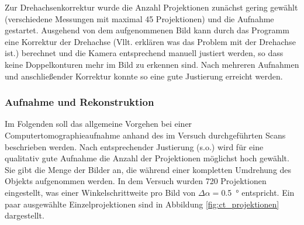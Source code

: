 \documentclass[11pt, a4paper]{article}
\numberwithin{equation}{section}
\newcommand{\korr}[1]{{\color{red}(#1)}}
\begin{document}
Zur Drehachsenkorrektur wurde die Anzahl Projektionen zunächst gering gewählt (verschiedene Messungen mit maximal \num{45} Projektionen) und die Aufnahme gestartet.
Ausgehend von dem aufgenommenen Bild kann durch das Programm eine Korrektur der Drehachse \korr{Vllt. erklären was das Problem mit der Drehachse ist.} berechnet und die Kamera entsprechend manuell justiert werden, so dass keine Doppelkonturen mehr im Bild zu erkennen sind.
Nach mehreren Aufnahmen und anschließender Korrektur konnte so eine gute Justierung erreicht werden.

\subsubsection{Aufnahme und Rekonstruktion}
\label{ct_aufnahme}

Im Folgenden soll das allgemeine Vorgehen bei einer Computertomographieaufnahme anhand des im Versuch durchgeführten Scans beschrieben werden.
Nach entsprechender Justierung (s.o.) wird für eine qualitativ gute Aufnahme die Anzahl der Projektionen möglichst hoch gewählt.
Sie gibt die Menge der Bilder an, die während einer kompletten Umdrehung des Objekts aufgenommen werden.
In dem Versuch wurden \num{720} Projektionen eingestellt, was einer Winkelschrittweite pro Bild von $\Delta\alpha=$\SI{0.5}{\degree} entspricht.
Ein paar ausgewählte Einzelprojektionen sind in Abbildung \ref{fig:ct_projektionen} dargestellt.
\end{document}
